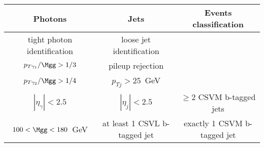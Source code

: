 \begin{tabular}{|c|c|c|}
\hline
Photons & Jets & Events classification \\
\hline
tight photon identification                        & loose jet identification  & \\
$p_{T \gamma_1}/ \Mgg > 1/3$  & pileup rejection   & \\
$p_{T \gamma_2}/ \Mgg > 1/4$  & $p_{T j} >25$~GeV  & \\
$|\eta_{\gamma}|<2.5$                              & $|\eta_{j}|<2.5$  & $\ge$2 CSVM b-tagged jets \\
$ 100 < \Mgg < 180$~GeV                 & at least 1 CSVL b-tagged jet & exactly 1 CSVM b-tagged jet \\
\hline
\end{tabular}
